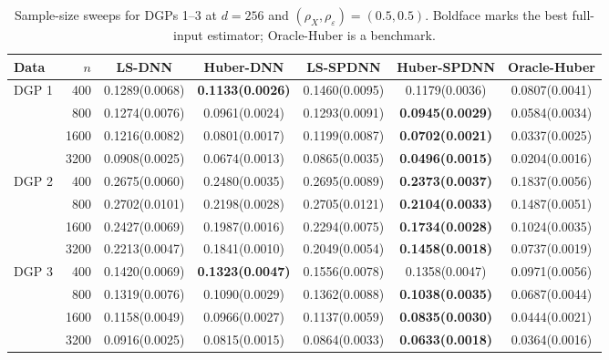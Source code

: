 \begin{table}[!ht]
\centering
\caption{Sample-size sweeps for DGPs 1--3 at $d=256$ and $(\rho_X,\rho_\varepsilon)=(0.5,0.5)$. Boldface marks the best full-input estimator; Oracle-Huber is a benchmark.}
\label{tab:sample-size-all}
\begin{adjustbox}{max width=\linewidth}
\begin{tabular}{@{}lrccccc@{}}
\toprule
Data & $n$ & LS-DNN & Huber-DNN & LS-SPDNN & Huber-SPDNN & Oracle-Huber\\
\midrule
\multirow{4}{*}{DGP 1} & 400 & 0.1289(0.0068) & \textbf{0.1133(0.0026)} & 0.1460(0.0095) & 0.1179(0.0036) & 0.0807(0.0041)\\
 & 800 & 0.1274(0.0076) & 0.0961(0.0024) & 0.1293(0.0091) & \textbf{0.0945(0.0029)} & 0.0584(0.0034)\\
 & 1600 & 0.1216(0.0082) & 0.0801(0.0017) & 0.1199(0.0087) & \textbf{0.0702(0.0021)} & 0.0337(0.0025)\\
 & 3200 & 0.0908(0.0025) & 0.0674(0.0013) & 0.0865(0.0035) & \textbf{0.0496(0.0015)} & 0.0204(0.0016)\\
\midrule
\multirow{4}{*}{DGP 2} & 400 & 0.2675(0.0060) & 0.2480(0.0035) & 0.2695(0.0089) & \textbf{0.2373(0.0037)} & 0.1837(0.0056)\\
 & 800 & 0.2702(0.0101) & 0.2198(0.0028) & 0.2705(0.0121) & \textbf{0.2104(0.0033)} & 0.1487(0.0051)\\
 & 1600 & 0.2427(0.0069) & 0.1987(0.0016) & 0.2294(0.0075) & \textbf{0.1734(0.0028)} & 0.1024(0.0035)\\
 & 3200 & 0.2213(0.0047) & 0.1841(0.0010) & 0.2049(0.0054) & \textbf{0.1458(0.0018)} & 0.0737(0.0019)\\
\midrule
\multirow{4}{*}{DGP 3} & 400 & 0.1420(0.0069) & \textbf{0.1323(0.0047)} & 0.1556(0.0078) & 0.1358(0.0047) & 0.0971(0.0056)\\
 & 800 & 0.1319(0.0076) & 0.1090(0.0029) & 0.1362(0.0088) & \textbf{0.1038(0.0035)} & 0.0687(0.0044)\\
 & 1600 & 0.1158(0.0049) & 0.0966(0.0027) & 0.1137(0.0059) & \textbf{0.0835(0.0030)} & 0.0444(0.0021)\\
 & 3200 & 0.0916(0.0025) & 0.0815(0.0015) & 0.0864(0.0033) & \textbf{0.0633(0.0018)} & 0.0364(0.0016)\\
\bottomrule
\end{tabular}
\end{adjustbox}
\end{table}

